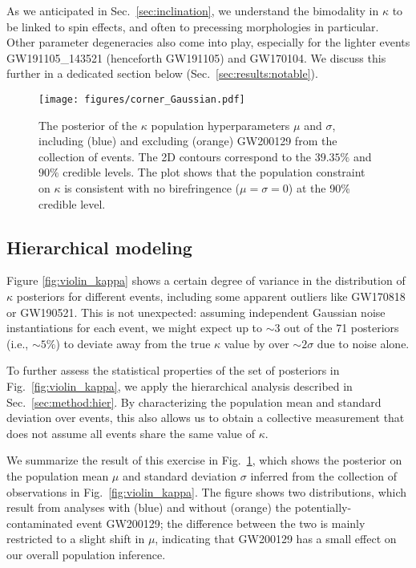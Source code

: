 \documentclass[aps,prd,twocolumn,superscriptaddress,preprintnumbers,floatfix,nofootinbib]{revtex4-2}
\begin{document}
As we anticipated in Sec.~\ref{sec:inclination}, we understand the bimodality in $\kappa$ to be linked to spin effects, and often to precessing morphologies in particular.
Other parameter degeneracies also come into play, especially for the lighter events GW191105\_143521 (henceforth GW191105) and GW170104.
We discuss this further in a dedicated section below (Sec.~\ref{sec:results:notable}).

\begin{figure}
    \texttt{[image: figures/corner\_Gaussian.pdf]}
    \caption{
        The posterior of the $\kappa$ population hyperparameters $\mu$ and $\sigma$, including (blue) and excluding (orange) GW200129 from the collection of events.
        The 2D contours correspond to the $39.35\%$ and $90\%$ credible levels.
        The plot shows that the population constraint on $\kappa$ is consistent with no birefringence ($\mu=\sigma=0$) at the 90\% credible level.
    }
    \label{fig:corner_Gaussian}
\end{figure}

\subsection{Hierarchical modeling}
\label{sec:results:hier}

Figure \ref{fig:violin_kappa} shows a certain degree of variance in the distribution of $\kappa$ posteriors for different events, including some apparent outliers like GW170818 or GW190521.
This is not unexpected: assuming independent Gaussian noise instantiations for each event, we might expect up to ${\sim}3$ out of the 71 posteriors (i.e., ${\sim}5\%$) to deviate away from the true $\kappa$ value by over ${\sim}2\sigma$ due to noise alone.

To further assess the statistical properties of the set of posteriors in Fig.~\ref{fig:violin_kappa}, we apply the hierarchical analysis described in Sec.~\ref{sec:method:hier}.
By characterizing the population mean and standard deviation over events, this also allows us to obtain a collective measurement that does not assume all events share the same value of $\kappa$.

We summarize the result of this exercise in Fig.~\ref{fig:corner_Gaussian}, which shows the posterior on the population mean $\mu$ and standard deviation $\sigma$ inferred from the collection of observations in Fig.~\ref{fig:violin_kappa}.
The figure shows two distributions, which result from analyses with (blue) and without (orange) the potentially-contaminated event GW200129; the difference between the two is mainly restricted to a slight shift in $\mu$, indicating that GW200129 has a small effect on our overall population inference.
\end{document}
